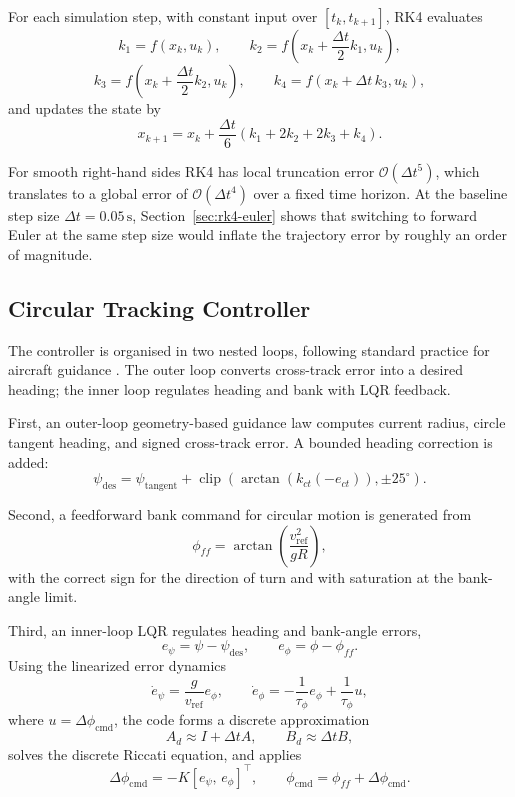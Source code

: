 \documentclass{Academic}
\begin{document}
For each simulation step, with constant input over \([t_k,t_{k+1}]\), RK4 evaluates
\[
k_1=f(x_k,u_k),\qquad
k_2=f\left(x_k+\frac{\Delta t}{2}k_1,u_k\right),
\]
\[
k_3=f\left(x_k+\frac{\Delta t}{2}k_2,u_k\right),\qquad
k_4=f\left(x_k+\Delta t\,k_3,u_k\right),
\]
and updates the state by
\[
x_{k+1}=x_k+\frac{\Delta t}{6}(k_1+2k_2+2k_3+k_4).
\]

For smooth right-hand sides RK4 has local truncation error \(\mathcal{O}(\Delta t^{5})\), which translates to a global error of \(\mathcal{O}(\Delta t^{4})\) over a fixed time horizon. At the baseline step size \(\Delta t=0.05\,\mathrm{s}\), Section~\ref{sec:rk4-euler} shows that switching to forward Euler at the same step size would inflate the trajectory error by roughly an order of magnitude.

\subsection{Circular Tracking Controller}

The controller is organised in two nested loops, following standard practice for aircraft guidance \supercite{astrom2008}. The outer loop converts cross-track error into a desired heading; the inner loop regulates heading and bank with LQR feedback.

First, an outer-loop geometry-based guidance law computes current radius, circle tangent heading, and signed cross-track error. A bounded heading correction is added:
\[
\psi_{\mathrm{des}}=\psi_{\mathrm{tangent}}+\operatorname{clip}\left(\arctan\left(k_{ct}(-e_{ct})\right),\pm25^\circ\right).
\]

Second, a feedforward bank command for circular motion is generated from
\[
\phi_{ff}=\arctan\left(\frac{v_{\mathrm{ref}}^2}{gR}\right),
\]
with the correct sign for the direction of turn and with saturation at the bank-angle limit.

Third, an inner-loop LQR regulates heading and bank-angle errors,
\[
e_\psi=\psi-\psi_{\mathrm{des}},\qquad e_\phi=\phi-\phi_{ff}.
\]
Using the linearized error dynamics
\[
\dot e_\psi=\frac{g}{v_{\mathrm{ref}}}e_\phi,\qquad
\dot e_\phi=-\frac{1}{\tau_\phi}e_\phi+\frac{1}{\tau_\phi}u,
\]
where \(u=\Delta\phi_{\mathrm{cmd}}\), the code forms a discrete approximation
\[
A_d\approx I+\Delta tA,\qquad B_d\approx \Delta tB,
\]
solves the discrete Riccati equation, and applies
\[
\Delta\phi_{\mathrm{cmd}}=-K[e_\psi,\,e_\phi]^\top,\qquad
\phi_{\mathrm{cmd}}=\phi_{ff}+\Delta\phi_{\mathrm{cmd}}.
\]
\end{document}
